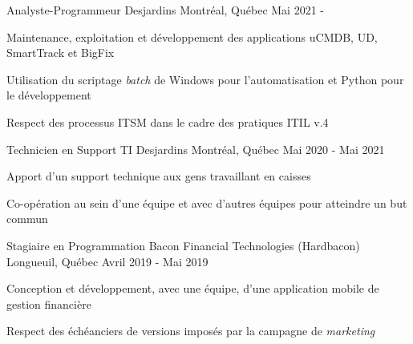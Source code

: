 

\begin{cventries}

  \cventry
    {Analyste-Programmeur} %
    {Desjardins} %
    {Montréal, Québec} %
    {Mai 2021 - } %
    {
      \begin{cvitems} %
        \item {Maintenance, exploitation et développement des applications uCMDB, UD, SmartTrack et BigFix}
        \item {Utilisation du scriptage \textit{batch} de Windows pour l'automatisation et Python pour le développement}
        \item {Respect des processus ITSM dans le cadre des pratiques ITIL v.4}
      \end{cvitems}
    }

  \cventry
    {Technicien en Support TI} %
    {Desjardins} %
    {Montréal, Québec} %
    {Mai 2020 - Mai 2021} %
    {
      \begin{cvitems} %
        \item {Apport d'un support technique aux gens travaillant en caisses}
        \item {Co-opération au sein d'une équipe et avec d'autres équipes pour atteindre un but commun}
      \end{cvitems}
    }
    
  \cventry
    {Stagiaire en Programmation} %
    {Bacon Financial Technologies (Hardbacon)} %
    {Longueuil, Québec} %
    {Avril 2019 - Mai 2019} %
    {
      \begin{cvitems} %
        \item {Conception et développement, avec une équipe, d'une application mobile de gestion financière}
        \item {Respect des échéanciers de versions imposés par la campagne de \textit{marketing}}
      \end{cvitems}
    }


\end{cventries}
